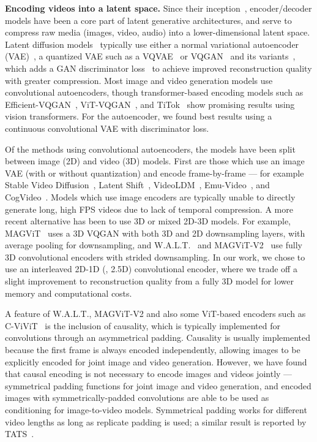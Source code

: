 \textbf{Encoding videos into a latent space.} Since their inception~\citep{rombach2021highresolution,Esser2021TamingTF}, encoder/decoder models have been a core part of latent generative architectures, and serve to compress raw media (images, video, audio) into a lower-dimensional latent space. Latent diffusion models~\citep{rombach2021highresolution} typically use either a normal variational autoencoder (VAE)~\citep{kingma2013auto}, a quantized VAE such as a VQVAE~\citep{van2017neural} or VQGAN~\citep{Esser2021TamingTF} and its variants~\citep{lee2022autoregressive}, which adds a GAN discriminator loss~\citep{goodfellow_GAN} to achieve improved reconstruction quality with greater compression.  Most image and video generation models use convolutional autoencoders, though transformer-based encoding models such as Efficient-VQGAN~\citep{cao2023efficient}, ViT-VQGAN~\citep{yu2021vector}, and TiTok~\citep{yu2024image} show promising results using vision transformers. For the \OURS autoencoder, we found best results using a continuous convolutional VAE with discriminator loss.

Of the methods using convolutional autoencoders, the models have been split between image (2D) and video (3D) models. First are those which use an image VAE (with or without quantization) and encode frame-by-frame — for example Stable Video Diffusion~\citep{sdvideo}, Latent Shift~\citep{an2023latentshift}, VideoLDM~\citep{Blattmann2023AlignYL}, Emu-Video~\citep{emuvideo2023}, and CogVideo~\citep{hong2022cogvideo}. Models which use image encoders are typically unable to directly generate long, high FPS videos due to lack of temporal compression. A more recent alternative has been to use 3D or mixed 2D-3D models. For example, MAGViT~\citep{52431} uses a 3D VQGAN with both 3D and 2D downsampling layers, with average pooling for downsampling, and W.A.L.T.~\citep{gupta2023photorealistic} and MAGViT-V2~\citep{yu2023language} use fully 3D convolutional encoders with strided downsampling. In our work, we chose to use an interleaved 2D-1D (\eg, 2.5D) convolutional encoder, where we trade off a slight improvement to reconstruction quality from a fully 3D model for lower memory and computational costs.

A feature of W.A.L.T., MAGViT-V2 and also some ViT-based encoders such as C-ViViT~\citep{villegas2023phenaki} is the inclusion of causality, which is typically implemented for convolutions through an asymmetrical padding. Causality is usually implemented because the first frame is always encoded independently, allowing images to be explicitly encoded for joint image and video generation. However, we have found that causal encoding is not necessary to encode images and videos jointly — symmetrical padding functions for joint image and video generation, and encoded images with symmetrically-padded convolutions are able to be used as conditioning for image-to-video models. Symmetrical padding works for different video lengths as long as replicate padding is used; a similar result is reported by TATS~\citep{ge2022long}.

